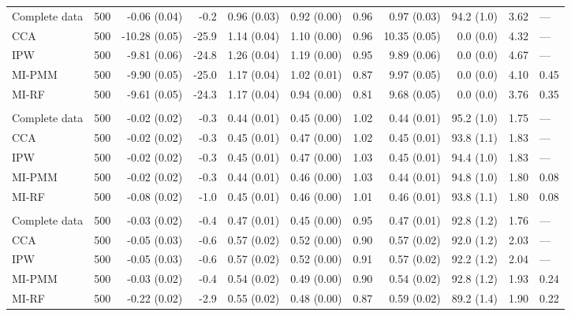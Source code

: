 \documentclass[11pt,a4paper]{article}
\begin{document}
\begin{landscape}
\begin{longtable}{l|rrrrrrrrrl}
\midrule\addlinespace[2.5pt]
\multicolumn{11}{l}{Stunting — MNAR 50\%} \\[2.5pt] 
\midrule\addlinespace[2.5pt]
Complete data & 500 & -0.06 (0.04) & -0.2 & 0.96 (0.03) & 0.92 (0.00) & 0.96 & 0.97 (0.03) & 94.2 (1.0) & 3.62 & — \\ 
CCA & 500 & -10.28 (0.05) & -25.9 & 1.14 (0.04) & 1.10 (0.00) & 0.96 & 10.35 (0.05) & 0.0 (0.0) & 4.32 & — \\ 
IPW & 500 & -9.81 (0.06) & -24.8 & 1.26 (0.04) & 1.19 (0.00) & 0.95 & 9.89 (0.06) & 0.0 (0.0) & 4.67 & — \\ 
MI-PMM & 500 & -9.90 (0.05) & -25.0 & 1.17 (0.04) & 1.02 (0.01) & 0.87 & 9.97 (0.05) & 0.0 (0.0) & 4.10 & 0.45 \\ 
MI-RF & 500 & -9.61 (0.05) & -24.3 & 1.17 (0.04) & 0.94 (0.00) & 0.81 & 9.68 (0.05) & 0.0 (0.0) & 3.76 & 0.35 \\ 
\midrule\addlinespace[2.5pt]
\multicolumn{11}{l}{Wasting — MCAR 10\%} \\[2.5pt] 
\midrule\addlinespace[2.5pt]
Complete data & 500 & -0.02 (0.02) & -0.3 & 0.44 (0.01) & 0.45 (0.00) & 1.02 & 0.44 (0.01) & 95.2 (1.0) & 1.75 & — \\ 
CCA & 500 & -0.02 (0.02) & -0.3 & 0.45 (0.01) & 0.47 (0.00) & 1.02 & 0.45 (0.01) & 93.8 (1.1) & 1.83 & — \\ 
IPW & 500 & -0.02 (0.02) & -0.3 & 0.45 (0.01) & 0.47 (0.00) & 1.03 & 0.45 (0.01) & 94.4 (1.0) & 1.83 & — \\ 
MI-PMM & 500 & -0.02 (0.02) & -0.3 & 0.44 (0.01) & 0.46 (0.00) & 1.03 & 0.44 (0.01) & 94.8 (1.0) & 1.80 & 0.08 \\ 
MI-RF & 500 & -0.08 (0.02) & -1.0 & 0.45 (0.01) & 0.46 (0.00) & 1.01 & 0.46 (0.01) & 93.8 (1.1) & 1.80 & 0.08 \\ 
\midrule\addlinespace[2.5pt]
\multicolumn{11}{l}{Wasting — MCAR 30\%} \\[2.5pt] 
\midrule\addlinespace[2.5pt]
Complete data & 500 & -0.03 (0.02) & -0.4 & 0.47 (0.01) & 0.45 (0.00) & 0.95 & 0.47 (0.01) & 92.8 (1.2) & 1.76 & — \\ 
CCA & 500 & -0.05 (0.03) & -0.6 & 0.57 (0.02) & 0.52 (0.00) & 0.90 & 0.57 (0.02) & 92.0 (1.2) & 2.03 & — \\ 
IPW & 500 & -0.05 (0.03) & -0.6 & 0.57 (0.02) & 0.52 (0.00) & 0.91 & 0.57 (0.02) & 92.2 (1.2) & 2.04 & — \\ 
MI-PMM & 500 & -0.03 (0.02) & -0.4 & 0.54 (0.02) & 0.49 (0.00) & 0.90 & 0.54 (0.02) & 92.8 (1.2) & 1.93 & 0.24 \\ 
MI-RF & 500 & -0.22 (0.02) & -2.9 & 0.55 (0.02) & 0.48 (0.00) & 0.87 & 0.59 (0.02) & 89.2 (1.4) & 1.90 & 0.22 \\ 

\end{longtable}
\end{landscape}
\end{document}
